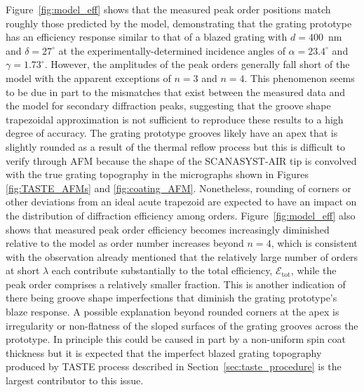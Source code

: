 \documentclass{aastex63}
\begin{document}
Figure~\ref{fig:model_eff} shows that the measured peak order positions match roughly those predicted by the model, demonstrating that the grating prototype has an efficiency response similar to that of a blazed grating with $d=400$~nm and $\delta = 27^{\circ}$ at the experimentally-determined incidence angles of $\alpha = 23.4^{\circ}$ and $\gamma = 1.73^{\circ}$. 
However, the amplitudes of the peak orders generally fall short of the model with the apparent exceptions of $n=3$ and $n=4$. 
This phenomenon seems to be due in part to the mismatches that exist between the measured data and the model for secondary diffraction peaks, suggesting that the groove shape trapezoidal approximation is not sufficient to reproduce these results to a high degree of accuracy. 
The grating prototype grooves likely have an apex that is slightly rounded as a result of the thermal reflow process but this is difficult to verify through AFM because the shape of the \textsc{SCANASYST-AIR} tip is convolved with the true grating topography in the micrographs shown in Figures \ref{fig:TASTE_AFMs} and \ref{fig:coating_AFM}. 
Nonetheless, rounding of corners or other deviations from an ideal acute trapezoid are expected to have an impact on the distribution of diffraction efficiency among orders. 
Figure~\ref{fig:model_eff} also shows that measured peak order efficiency becomes increasingly diminished relative to the model as order number increases beyond $n=4$, which is consistent with the observation already mentioned that the relatively large number of orders at short $\lambda$ each contribute substantially to the total efficiency, $\mathcal{E}_{\text{tot}}$, while the peak order comprises a relatively smaller fraction. 
This is another indication of there being groove shape imperfections that diminish the grating prototype's blaze response. 
A possible explanation beyond rounded corners at the apex is irregularity or non-flatness of the sloped surfaces of the grating grooves across the prototype. 
In principle this could be caused in part by a non-uniform spin coat thickness but it is expected that the imperfect blazed grating topography produced by TASTE process described in Section~\ref{sec:taste_procedure} is the largest contributor to this issue.  
\end{document}
